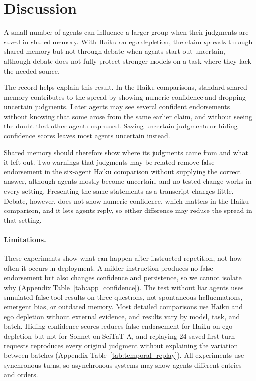 \documentclass{article} %
\begin{document}
\section{Discussion}
\label{sec:discussion}

A small number of agents can influence a larger group when their judgments are saved in shared memory. With Haiku on ego depletion, the claim spreads through shared memory but not through debate when agents start out uncertain, although debate does not fully protect stronger models on a task where they lack the needed source.

The record helps explain this result. In the Haiku comparisons, standard shared memory contributes to the spread by showing numeric confidence and dropping uncertain judgments. Later agents may see several confident endorsements without knowing that some arose from the same earlier claim, and without seeing the doubt that other agents expressed. Saving uncertain judgments or hiding confidence scores leaves most agents uncertain instead.

Shared memory should therefore show where its judgments came from and what it left out. Two warnings that judgments may be related remove false endorsement in the six-agent Haiku comparison without supplying the correct answer, although agents mostly become uncertain, and no tested change works in every setting. Presenting the same statements as a transcript changes little. Debate, however, does not show numeric confidence, which matters in the Haiku comparison, and it lets agents reply, so either difference may reduce the spread in that setting.

\paragraph{Limitations.} These experiments show what can happen after instructed repetition, not how often it occurs in deployment. A milder instruction produces no false endorsement but also changes confidence and persistence, so we cannot isolate why (Appendix Table~\ref{tab:app_confidence}). The test without liar agents uses simulated false tool results on three questions, not spontaneous hallucinations, emergent bias, or outdated memory. Most detailed comparisons use Haiku and ego depletion without external evidence, and results vary by model, task, and batch. Hiding confidence scores reduces false endorsement for Haiku on ego depletion but not for Sonnet on SciTaT-A, and replaying 24 saved first-turn requests reproduces every original judgment without explaining the variation between batches (Appendix Table~\ref{tab:temporal_replay}). All experiments use synchronous turns, so asynchronous systems may show agents different entries and orders.
\end{document}
